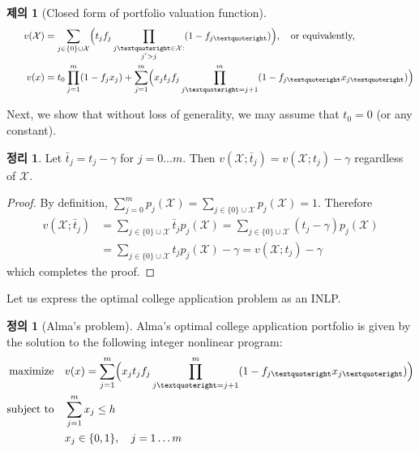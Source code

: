 \documentclass[12pt]{article} %
\newtheorem{theorem}{Theorem}
\newtheorem{proposition}{Proposition}
\theoremstyle{definition}
\newtheorem{definition}{Definition}
\newtheorem{theorem}{정리}
\newtheorem{proposition}{제의}
\theoremstyle{definition}
\newtheorem{definition}{정의}
\begin{document}
\begin{proposition}[Closed form of portfolio valuation function]
\begin{align}
v(\mathcal{X}) &= \sum_{j\in\{0\}\cup\mathcal{X}} \Bigl( t_j f_j  \prod_{\substack{j’ \in \mathcal{X}: \\ j' > j}} (1 - f_{j’}) \Bigr), \quad \text{or equivalently,} \label{closedformportfoliovaluationX}\\
\qquad v(x) &= t_0 \prod_{j=1}^m (1 - f_{j} x_j) + \sum_{j=1}^m \Bigl( x_j t_j f_j \prod_{j’ = j+1}^m (1 - f_{j’} x_{j’}) \Bigr) \label{closedformportfoliovaluationx}
\end{align}
\end{proposition}

Next, we show that without loss of generality, we may assume that $t_0 = 0$ (or any constant).
\begin{theorem} \label{assumetzerozero}
Let $\bar t_j = t_j - \gamma$ for $j = 0 \dots m$. Then $v(\mathcal{X}; \bar t_j) = v(\mathcal{X};  t_j) -  \gamma$ regardless of $\mathcal{X}$. 
\end{theorem}
\begin{proof}
By definition, $\sum_{j=0}^m p_j(\mathcal{X}) = \sum_{j \in \{0\}\cup\mathcal{X}} p_j(\mathcal{X}) = 1$. Therefore
\begin{align}
v(\mathcal{X}; \bar t_j) &= \sum_{j\in \{0\}\cup\mathcal{X}}  \bar t_j p_j(\mathcal{X})
=\sum_{j\in \{0\}\cup\mathcal{X}} (t_j - \gamma) p_j(\mathcal{X}) \\
&=\sum_{j\in \{0\}\cup\mathcal{X}} t_j p_j(\mathcal{X})  - \gamma 
= v(\mathcal{X}; t_j) - \gamma
\end{align}
which completes the proof. 
\end{proof}

Let us express the optimal college application problem as an INLP.
\begin{definition}[Alma’s problem]
Alma's optimal college application portfolio is given by the solution to the following integer nonlinear program:
\begin{align}
\begin{split}
\text{maximize}\quad & v(x) = \sum_{j=1}^m \Bigl(x_j t_j f_j \prod_{j’ = j+1}^m (1 - f_{j’} x_{j’}) \Bigr) \\
\text{subject to}\quad & \sum_{j=1}^m x_j \leq h \\
&x_j \in \{0, 1\}, \quad j = 1\dots m
\end{split}
\end{align}
\end{definition}
\end{document}
